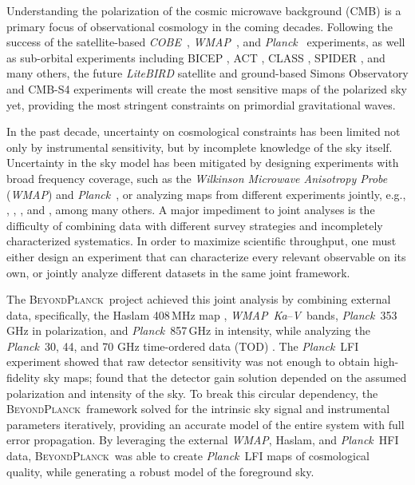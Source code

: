 \documentclass[twocolumn]{../../common/aa}
\def\WMAP{\emph{WMAP}}
\def\COBE{\emph{COBE}}
\def\Planck{\emph{Planck}}
\newcommand{\bp}{\textsc{BeyondPlanck}}
\newcommand{\Ka}[0]{\textit{Ka}}
\newcommand{\V}[0]{\textit V}
\begin{document}
Understanding the polarization of the cosmic microwave background (CMB) is a primary focus of observational cosmology in the coming decades. Following the success of the satellite-based \COBE\ \citep{smoot:1992,mather:1994,hauser:1998}, \WMAP\ \citep{bennett2012}, and \Planck\ \citep{planck2016-l01} experiments, as well as sub-orbital experiments including BICEP \citep{bicep2021}, ACT \citep{actDR6_lensing}, CLASS \citep{eimer2023}, SPIDER \citep{spider21}, and many others, the future \textit{LiteBIRD} satellite \citep{ptep} and ground-based Simons Observatory \citep{SO2019} and CMB-S4 \citep{cmbs4} experiments will create the most sensitive maps of the polarized sky yet, providing the most stringent constraints on primordial gravitational waves.

In the past decade, uncertainty on cosmological constraints has been limited not only by instrumental sensitivity, but by incomplete knowledge of the sky itself. Uncertainty in the sky model has been mitigated by designing experiments with broad frequency coverage, such as the \textit{Wilkinson Microwave Anisotropy Probe} (\WMAP) \citep{bennett2012} and \Planck\ \citep{planck2016-l01}, or analyzing maps from different experiments jointly, e.g., \citet{dmr}, \citet{bennett2012}, \citet{planck2014-a12}, and \citet{pb2015}, among many others.
A major impediment to joint analyses is the difficulty of combining data with different survey strategies and incompletely characterized systematics. In order to maximize scientific throughput, one must either design an experiment that can characterize every relevant observable on its own, or jointly analyze different datasets in the same joint framework.

The \bp\ project achieved this joint analysis by combining external data, specifically, the Haslam 408\,MHz map \citep{haslam1982}, \WMAP\ \Ka--\V\ bands, \Planck\ 353\,GHz in polarization, and \Planck\ 857\,GHz in intensity, while analyzing the \Planck\ 30, 44, and 70 GHz time-ordered data (TOD) \citep{bp01}.
The \Planck\ LFI experiment showed that raw detector sensitivity was not enough to obtain high-fidelity sky maps; \citet{planck2016-l02} found that the detector gain solution depended on the assumed polarization and intensity of the sky. To break this circular dependency, the \bp\ framework solved for the intrinsic sky signal and instrumental parameters iteratively, providing an accurate model of the entire system with full error propagation. By leveraging the external \WMAP, Haslam, and \Planck\ HFI  data, \bp\ was able to create \Planck\ LFI maps of cosmological quality, while generating a robust model of the foreground sky.
\end{document}
